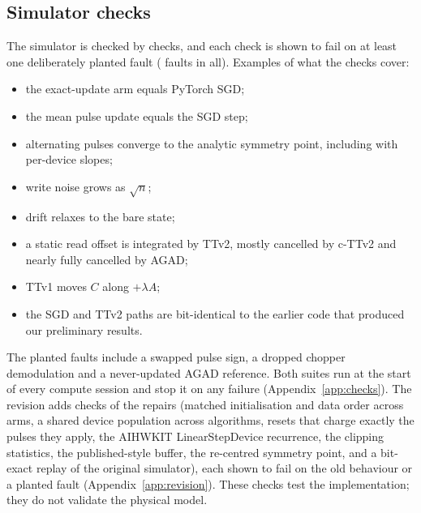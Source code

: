 \subsection{Simulator checks}\label{sec:checks}
The simulator is checked by \nChecks{} checks, and each check is shown to fail on at least one deliberately planted fault
(\nFaults{} faults in all). Examples of what the checks cover:
\begin{itemize}
\item the exact-update arm equals PyTorch SGD;
\item the mean pulse update equals the SGD step;
\item alternating pulses converge to the analytic symmetry point, including with per-device slopes;
\item write noise grows as $\sqrt n$;
\item drift relaxes to the bare state;
\item a static read offset is integrated by TTv2, mostly cancelled by c-TTv2 and nearly fully cancelled by AGAD;
\item TTv1 moves $C$ along $+\lambda A$;
\item the SGD and TTv2 paths are bit-identical to the earlier code that produced our preliminary results.
\end{itemize}
The planted faults include a swapped pulse sign, a dropped chopper demodulation and a never-updated AGAD reference.
Both suites run at the start of every compute session and stop it on any failure (Appendix~\ref{app:checks}). The revision
adds \RVnChecks{} checks of the repairs (matched initialisation and data order across arms, a shared device population across
algorithms, resets that charge exactly the pulses they apply, the AIHWKIT LinearStepDevice recurrence, the clipping statistics,
the published-style buffer, the re-centred symmetry point, and a bit-exact replay of the original simulator), each shown to
fail on the old behaviour or a planted fault (Appendix~\ref{app:revision}). These checks test the implementation; they do not
validate the physical model.
